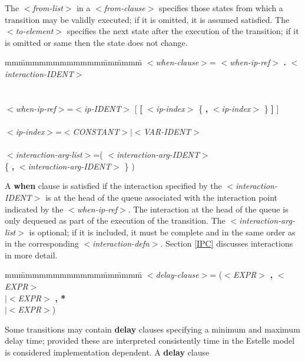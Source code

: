 The $<${\em from-list}$>$ in a $<${\em from-clause}$>$ specifies those states
from which a transition may be validly executed; if it is
omitted, it is assumed satisfied. The $<${\em to-element}$>$
specifies the next state after the execution of the
transition; if it is omitted or same then the state does not
change.

\begin{tabbing}
mm\=mmmmmmmmmmmm\=mm\=mmmm\=\+\kill
$<${\em when-clause}$>$\>= $<${\em when-ip-ref}$>$ {\bf .} $<${\em
interaction-IDENT}$>$\\
\>\>\\
\mbox{}\\
$<${\em when-ip-ref}$>$\>=\>$<${\em ip-IDENT}$>$ [ {\bf [} $<${\em ip-index}$>$
\{ {\bf ,} $<${\em ip-index}$>$ \} {\bf ]} ]\\
\mbox{}\\
$<${\em ip-index}$>$\>=\>$<${\em CONSTANT}$>|<${\em VAR-IDENT}$>$\\
\mbox{}\\
$<${\em interaction-arg-list}$>$\>=\>( $<${\em interaction-arg-IDENT}$>$\\
\>\>\>\{ {\bf ,} $<${\em interaction-arg-IDENT}$>$ \} )\\
\end{tabbing}

A {\bf when} clause is satisfied if the interaction specified
by the $<${\em interaction-IDENT}$>$ is at the head of the queue
associated with the interaction point indicated by the
$<${\em when-ip-ref}$>$. The interaction at the head of the queue is
only dequeued as part of the execution of the transition.
The $<${\em interaction-arg-list}$>$ is optional; if it is included,
it must be complete and in the same order as in the
corresponding $<${\em interaction-defn}$>$. Section \ref{IPC} discusses
interactions in more detail.

\begin{tabbing}
mm\=mmmmmmmmmmmm\=mm\=mmmm\=\+\kill
$<${\em delay-clause}$>$\>= ($<${\em EXPR}$>$ {\bf ,} $<${\em
EXPR}$>$\\
\>\>\>$|<${\em EXPR}$>$ {\bf , *}\\
\>\>\>$|<${\em EXPR}$>$)\\
\>\>\>{\bf )}
\end{tabbing}

Some transitions may contain {\bf delay} clauses specifying a
minimum and maximum delay time; provided these are
interpreted consistently time in the Estelle model is
considered implementation dependent. A {\bf delay} clause
 
